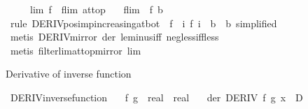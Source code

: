 \begin{isabellebody}
\ \ \ \ \ lim{\isacharcolon}{\kern0pt}\ {\isachardoublequoteopen}{\isacharparenleft}{\kern0pt}f\ {\isasymlonglongrightarrow}\ flim{\isacharparenright}{\kern0pt}\ at{\isacharunderscore}{\kern0pt}top{\isachardoublequoteclose}\isanewline
\ \ \ {\isachardoublequoteopen}flim\ {\isacharless}{\kern0pt}\ f\ b{\isachardoublequoteclose}\isanewline
%
\isadelimproof
\ \ %
\endisadelimproof
%
\isatagproof
{}\isamarkupfalse%
\ {\isacharparenleft}{\kern0pt}rule\ DERIV{\isacharunderscore}{\kern0pt}pos{\isacharunderscore}{\kern0pt}imp{\isacharunderscore}{\kern0pt}increasing{\isacharunderscore}{\kern0pt}at{\isacharunderscore}{\kern0pt}bot\ {\isacharbrackleft}{\kern0pt}\ f\ {\isacharequal}{\kern0pt}\ {\isachardoublequoteopen}{\isasymlambda}i{\isachardot}{\kern0pt}\ f\ {\isacharparenleft}{\kern0pt}{\isacharminus}{\kern0pt}i{\isacharparenright}{\kern0pt}{\isachardoublequoteclose}\ \ b\ {\isacharequal}{\kern0pt}\ {\isachardoublequoteopen}{\isacharminus}{\kern0pt}b{\isachardoublequoteclose}{\isacharcomma}{\kern0pt}\ simplified{\isacharbrackright}{\kern0pt}{\isacharparenright}{\kern0pt}\isanewline
\ \ \ \isamarkupfalse%
\ {\isacharparenleft}{\kern0pt}metis\ DERIV{\isacharunderscore}{\kern0pt}mirror\ der\ le{\isacharunderscore}{\kern0pt}minus{\isacharunderscore}{\kern0pt}iff\ neg{\isacharunderscore}{\kern0pt}{}{\isacharunderscore}{\kern0pt}less{\isacharunderscore}{\kern0pt}iff{\isacharunderscore}{\kern0pt}less{\isacharparenright}{\kern0pt}\isanewline
\ \ \isamarkupfalse%
\ {\isacharparenleft}{\kern0pt}metis\ filterlim{\isacharunderscore}{\kern0pt}at{\isacharunderscore}{\kern0pt}top{\isacharunderscore}{\kern0pt}mirror\ lim{\isacharparenright}{\kern0pt}\isanewline
\ \ \isamarkupfalse%
%
\endisatagproof
{\isafoldproof}%
%
\isadelimproof
%
\endisadelimproof
%
\begin{isamarkuptext}%
Derivative of inverse function%
\end{isamarkuptext}\isamarkuptrue%
\isamarkupfalse%
\ DERIV{\isacharunderscore}{\kern0pt}inverse{\isacharunderscore}{\kern0pt}function{\isacharcolon}{\kern0pt}\isanewline
\ \ \ f\ g\ {\isacharcolon}{\kern0pt}{\isacharcolon}{\kern0pt}\ {\isachardoublequoteopen}real\ {\isasymRightarrow}\ real{\isachardoublequoteclose}\isanewline
\ \ \ der{\isacharcolon}{\kern0pt}\ {\isachardoublequoteopen}DERIV\ f\ {\isacharparenleft}{\kern0pt}g\ x{\isacharparenright}{\kern0pt}\ {\isacharcolon}{\kern0pt}{\isachargreater}{\kern0pt}\ D{\isachardoublequoteclose}\isanewline

\end{isabellebody}
